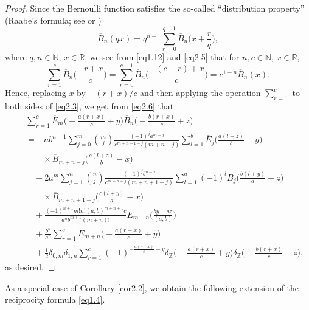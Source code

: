 \documentclass[reqno]{amsart}
\numberwithin{equation}{section}
\begin{document}
\begin{proof}
Since the Bernoulli function satisfies the so-called ``distribution property'' (Raabe's formula; see \cite{raabe} or \cite[Equation (3.43)]{he3})
\begin{equation}\label{eq2.5}
\overline{B}_{n}(qx)=q^{n-1}\sum_{r=0}^{q-1}\overline{B}_{n}\biggl(x+\frac{r}{q}\biggl),
\end{equation}
where $q,n\in\mathbb{N}$, $x\in\mathbb{R}$, we see from \eqref{eq1.12} and \eqref{eq2.5} that for $n,c\in\mathbb{N}$, $x\in\mathbb{R}$,
\begin{equation}\label{eq2.6}
\sum_{r=1}^{c}\overline{B}_{n}\biggl(\frac{-r+x}{c}\biggl)=\sum_{r=0}^{c-1}\overline{B}_{n}\biggl(\frac{-(c-r)+x}{c}\biggl)=c^{1-n}\overline{B}_{n}(x).
\end{equation}
Hence, replacing $x$ by $-(r+x)/c$ and then applying the operation $\sum_{r=1}^{c}$ to both sides of \eqref{eq2.3},  we get from \eqref{eq2.6} that
\begin{eqnarray*}
&&\sum_{r=1}^{c}\overline{E}_{m}\biggl(-\frac{a(r+x)}{c}+y\biggl)\overline{B}_{n}\biggl(-\frac{b(r+x)}{c}+z\biggl)\\
&&=-nb^{n-1}\sum_{j=0}^{m}\binom{m}{j}\frac{(-1)^{j}a^{m-j}}{c^{m+n-1-j}(m+n-j)}
\sum_{l=1}^{b}\overline{E}_{j}\biggl(\frac{a(l+z)}{b}-y\biggl)\\
&&\qquad\times\overline{B}_{m+n-j}\biggl(\frac{c(l+z)}{b}-x\biggl)\\
&&\quad-2a^{m}\sum_{j=1}^{n}\binom{n}{j}\frac{(-1)^{j}b^{n-j}}{c^{m+n-j}(m+n+1-j)}\sum_{l=1}^{a}(-1)^{l}\overline{B}_{j}\biggl(\frac{b(l+y)}{a}-z\biggl)\\
&&\qquad\times\overline{B}_{m+n+1-j}\biggl(\frac{c(l+y)}{a}-x\biggl)\\
&&\quad+\frac{(-1)^{n+1}m!n!(a,b)^{m+n+1}c}{a^{n}b^{m+1}(m+n)!}\overline{E}_{m+n}\biggl(\frac{by-az}{(a,b)}\biggl)\\
&&\quad+\frac{b^{n}}{a^{n}}\sum_{r=1}^{c}\overline{E}_{m+n}\biggl(-\frac{a(r+x)}{c}+y\biggl)\\
&&\quad+\frac{1}{2}\delta_{0,m}\delta_{1,n}\sum_{r=1}^{c}(-1)^{-\frac{a(r+x)}{c}+y}
\delta_{\mathbb{Z}}\biggl(-\frac{a(r+x)}{c}+y\biggl)\delta_{\mathbb{Z}}\biggl(-\frac{b(r+x)}{c}+z\biggl),
\end{eqnarray*}
as desired.
\end{proof}

As a special case of Corollary \ref{cor2.2}, we obtain the following extension of the reciprocity formula \eqref{eq1.4}.
\end{document}
